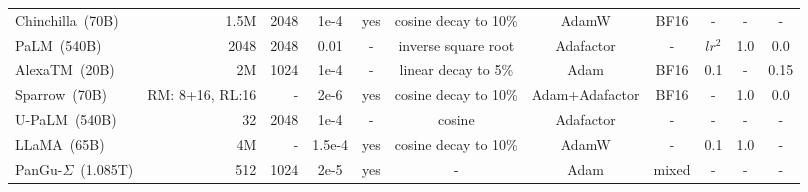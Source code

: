 \begin{table*}[tbp]
{\begin{tabular}{lrrcccccccc}
Chinchilla~(70B) & 1.5M & 2048 & 1e-4 & yes & cosine decay to 10\% & AdamW & BF16 & - & - & -                \\

PaLM~(540B) & 2048 & 2048 & 0.01 & - & inverse square root & Adafactor  & -  & $lr^2$ & 1.0 & 0.0              \\

AlexaTM~(20B) & 2M &1024 & 1e-4 &- & linear decay to 5\%   & Adam & BF16  &0.1 & - &0.15              \\

Sparrow~(70B)& RM: 8+16, RL:16 &- & 2e-6 &yes & cosine decay to 10\%   & Adam+Adafactor & BF16  &- & 1.0 &0.0 \\

U-PaLM~(540B) & 32 & 2048 & 1e-4 & - & cosine & Adafactor  & -  & - & - & -              \\

LLaMA~(65B) & 4M &- & 1.5e-4 & yes & cosine decay to 10\%    & AdamW & -  & 0.1 & 1.0 & -                \\

PanGu-$\Sigma$~(1.085T) & 512  & 1024 & 2e-5 & yes & - & Adam & mixed & - & - & -                \\
\bottomrule
\end{tabular}
}
\end{table*}


